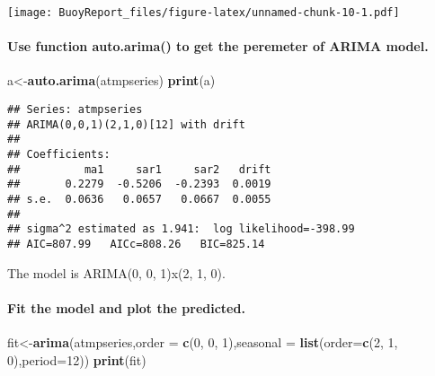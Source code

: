 \documentclass[]{article}
\newenvironment{Shaded}{\begin{snugshade}}{\end{snugshade}}
\newcommand{\DataTypeTok}[1]{\textcolor[rgb]{0.13,0.29,0.53}{#1}}
\newcommand{\DecValTok}[1]{\textcolor[rgb]{0.00,0.00,0.81}{#1}}
\newcommand{\KeywordTok}[1]{\textcolor[rgb]{0.13,0.29,0.53}{\textbf{#1}}}
\newcommand{\NormalTok}[1]{#1}
\newcommand{\OperatorTok}[1]{\textcolor[rgb]{0.81,0.36,0.00}{\textbf{#1}}}
\newcommand{\StringTok}[1]{\textcolor[rgb]{0.31,0.60,0.02}{#1}}
\let\oldparagraph\paragraph
\renewcommand{\paragraph}[1]{\oldparagraph{#1}\mbox{}}
\begin{document}
\begin{Shaded}
\end{Shaded}

\texttt{[image: BuoyReport\_files/figure-latex/unnamed-chunk-10-1.pdf]}

\hypertarget{use-function-auto.arima-to-get-the-peremeter-of-arima-model.}{%
\paragraph{Use function auto.arima() to get the peremeter of ARIMA
model.}\label{use-function-auto.arima-to-get-the-peremeter-of-arima-model.}}

\begin{Shaded}
\begin{Highlighting}[]
\NormalTok{a<-}\KeywordTok{auto.arima}\NormalTok{(atmpseries)}
\KeywordTok{print}\NormalTok{(a)}
\end{Highlighting}
\end{Shaded}

\begin{verbatim}
## Series: atmpseries 
## ARIMA(0,0,1)(2,1,0)[12] with drift 
## 
## Coefficients:
##          ma1     sar1     sar2   drift
##       0.2279  -0.5206  -0.2393  0.0019
## s.e.  0.0636   0.0657   0.0667  0.0055
## 
## sigma^2 estimated as 1.941:  log likelihood=-398.99
## AIC=807.99   AICc=808.26   BIC=825.14
\end{verbatim}

The model is ARIMA(0, 0, 1)x(2, 1, 0).

\hypertarget{fit-the-model-and-plot-the-predicted.}{%
\paragraph{Fit the model and plot the
predicted.}\label{fit-the-model-and-plot-the-predicted.}}

\begin{Shaded}
\begin{Highlighting}[]
\NormalTok{fit<-}\KeywordTok{arima}\NormalTok{(atmpseries,}\DataTypeTok{order =} \KeywordTok{c}\NormalTok{(}\DecValTok{0}\NormalTok{, }\DecValTok{0}\NormalTok{, }\DecValTok{1}\NormalTok{),}\DataTypeTok{seasonal =} \KeywordTok{list}\NormalTok{(}\DataTypeTok{order=}\KeywordTok{c}\NormalTok{(}\DecValTok{2}\NormalTok{, }\DecValTok{1}\NormalTok{, }\DecValTok{0}\NormalTok{),}\DataTypeTok{period=}\DecValTok{12}\NormalTok{))}
\KeywordTok{print}\NormalTok{(fit)}
\end{Highlighting}
\end{Shaded}
\end{document}
